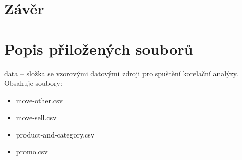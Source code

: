 \documentclass[a4paper,oneside,12pt]{book}
\begin{document}









\chapter*{Závěr} %
%



\let\origaddvspace\addvspace
\renewcommand{\addvspace}[1]{}
\listoffigures
\listoftables
\renewcommand{\addvspace}[1]{\origaddvspace{#1}}

\clearpage  %


% 
% 


\newpage %
\appendix %



\chapter{Popis přiložených souborů}
%
data -- složka se vzorovými datovými zdroji pro spuštění korelační analýzy. Obsahuje soubory:
\begin{itemize}
  \itemsep0em
  \item move-other.csv
  \item move-sell.csv
  \item product-and-category.csv
  \item promo.csv
\end{itemize}
\end{document}
